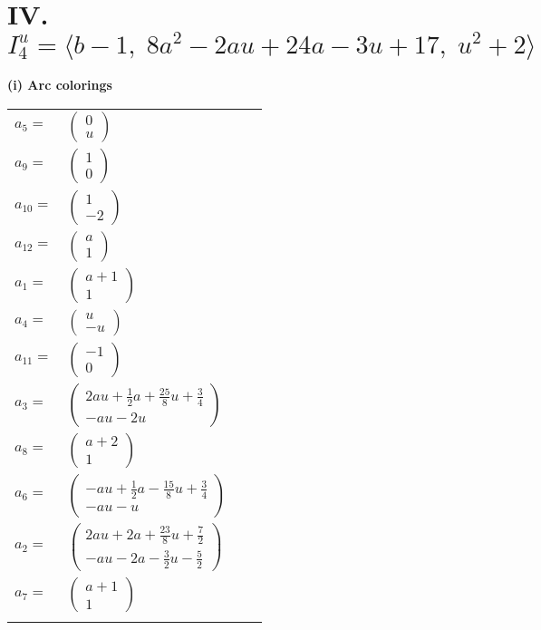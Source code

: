 \documentclass[1p]{elsarticle_modified}
\theoremstyle{definition}
\begin{document}
\centering \section*{IV. $I^u_{4}= \langle b-1,\;8 a^2-2 a u+24 a-3 u+17,\;u^2+2 \rangle$}
\flushleft \textbf{(i) Arc colorings}\\
\begin{tabular}{m{7pt} m{180pt} m{7pt} m{180pt} }
\flushright $a_{5}=$&$\begin{pmatrix}0\\u\end{pmatrix}$ \\
\flushright $a_{9}=$&$\begin{pmatrix}1\\0\end{pmatrix}$ \\
\flushright $a_{10}=$&$\begin{pmatrix}1\\-2\end{pmatrix}$ \\
\flushright $a_{12}=$&$\begin{pmatrix}a\\1\end{pmatrix}$ \\
\flushright $a_{1}=$&$\begin{pmatrix}a+1\\1\end{pmatrix}$ \\
\flushright $a_{4}=$&$\begin{pmatrix}u\\- u\end{pmatrix}$ \\
\flushright $a_{11}=$&$\begin{pmatrix}-1\\0\end{pmatrix}$ \\
\flushright $a_{3}=$&$\begin{pmatrix}2 a u+\frac{1}{2} a+\frac{25}{8} u+\frac{3}{4}\\- a u-2 u\end{pmatrix}$ \\
\flushright $a_{8}=$&$\begin{pmatrix}a+2\\1\end{pmatrix}$ \\
\flushright $a_{6}=$&$\begin{pmatrix}- a u+\frac{1}{2} a-\frac{15}{8} u+\frac{3}{4}\\- a u- u\end{pmatrix}$ \\
\flushright $a_{2}=$&$\begin{pmatrix}2 a u+2 a+\frac{23}{8} u+\frac{7}{2}\\- a u-2 a-\frac{3}{2} u-\frac{5}{2}\end{pmatrix}$ \\
\flushright $a_{7}=$&$\begin{pmatrix}a+1\\1\end{pmatrix}$\\&\end{tabular}
\end{document}
